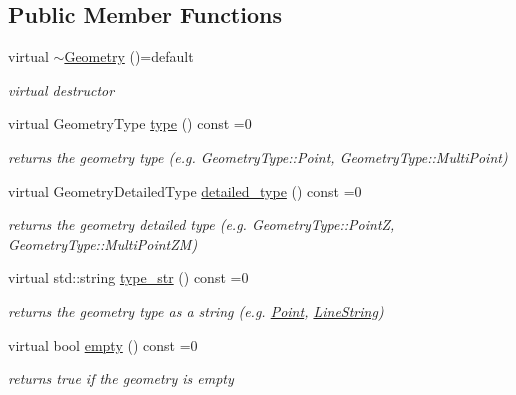 \subsection*{Public Member Functions}
\begin{DoxyCompactItemize}
\item 
\hypertarget{classsimo_1_1shapes_1_1_geometry_ad0611340eaded743bbdfe0abb43c59a4}{virtual \hyperlink{classsimo_1_1shapes_1_1_geometry_ad0611340eaded743bbdfe0abb43c59a4}{$\sim$\-Geometry} ()=default}\label{classsimo_1_1shapes_1_1_geometry_ad0611340eaded743bbdfe0abb43c59a4}

\begin{DoxyCompactList}\small\item\em virtual destructor \end{DoxyCompactList}\item 
virtual Geometry\-Type \hyperlink{classsimo_1_1shapes_1_1_geometry_a97a21e31df877cd74da81e08e6e1c7ff}{type} () const =0
\begin{DoxyCompactList}\small\item\em returns the geometry type (e.\-g. Geometry\-Type\-::\-Point, Geometry\-Type\-::\-Multi\-Point) \end{DoxyCompactList}\item 
virtual Geometry\-Detailed\-Type \hyperlink{classsimo_1_1shapes_1_1_geometry_a5633ca34213554220aa19257260b2211}{detailed\-\_\-type} () const =0
\begin{DoxyCompactList}\small\item\em returns the geometry detailed type (e.\-g. Geometry\-Type\-::\-Point\-Z, Geometry\-Type\-::\-Multi\-Point\-Z\-M) \end{DoxyCompactList}\item 
virtual std\-::string \hyperlink{classsimo_1_1shapes_1_1_geometry_aa4fc3ffa8fa908f238c2917166a4f0a1}{type\-\_\-str} () const =0
\begin{DoxyCompactList}\small\item\em returns the geometry type as a string (e.\-g. \hyperlink{classsimo_1_1shapes_1_1_point}{Point}, \hyperlink{classsimo_1_1shapes_1_1_line_string}{Line\-String}) \end{DoxyCompactList}\item 
virtual bool \hyperlink{classsimo_1_1shapes_1_1_geometry_ab53733864d430504fd7ed2b564c96ef5}{empty} () const =0
\begin{DoxyCompactList}\small\item\em returns true if the geometry is empty \end{DoxyCompactList}\item 

\end{DoxyCompactItemize}
